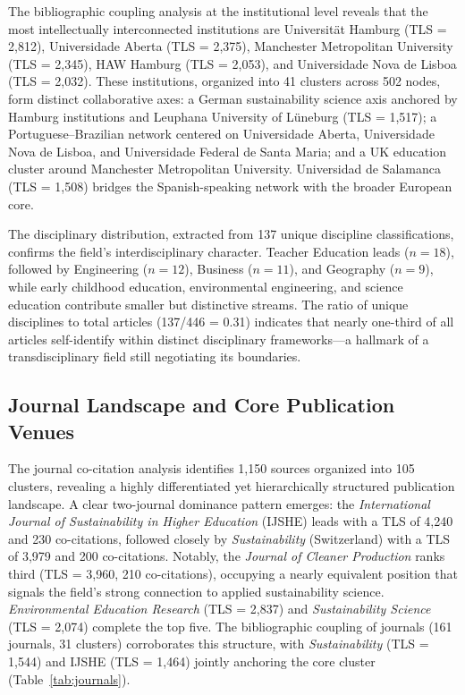 \documentclass[pdflatex,sn-basic]{sn-jnl}%
\begin{document}
The bibliographic coupling analysis at the institutional level reveals that the most intellectually interconnected institutions are Universit\"{a}t Hamburg (TLS = 2,812), Universidade Aberta (TLS = 2,375), Manchester Metropolitan University (TLS = 2,345), HAW Hamburg (TLS = 2,053), and Universidade Nova de Lisboa (TLS = 2,032). These institutions, organized into 41 clusters across 502 nodes, form distinct collaborative axes: a German sustainability science axis anchored by Hamburg institutions and Leuphana University of L\"{u}neburg (TLS = 1,517); a Portuguese--Brazilian network centered on Universidade Aberta, Universidade Nova de Lisboa, and Universidade Federal de Santa Maria; and a UK education cluster around Manchester Metropolitan University. Universidad de Salamanca (TLS = 1,508) bridges the Spanish-speaking network with the broader European core.

The disciplinary distribution, extracted from 137 unique discipline classifications, confirms the field's interdisciplinary character. Teacher Education leads ($n = 18$), followed by Engineering ($n = 12$), Business ($n = 11$), and Geography ($n = 9$), while early childhood education, environmental engineering, and science education contribute smaller but distinctive streams. The ratio of unique disciplines to total articles (137/446 = 0.31) indicates that nearly one-third of all articles self-identify within distinct disciplinary frameworks---a hallmark of a transdisciplinary field still negotiating its boundaries.

\subsection{Journal Landscape and Core Publication Venues}

The journal co-citation analysis identifies 1,150 sources organized into 105 clusters, revealing a highly differentiated yet hierarchically structured publication landscape. A clear two-journal dominance pattern emerges: the \textit{International Journal of Sustainability in Higher Education} (IJSHE) leads with a TLS of 4,240 and 230 co-citations, followed closely by \textit{Sustainability} (Switzerland) with a TLS of 3,979 and 200 co-citations. Notably, the \textit{Journal of Cleaner Production} ranks third (TLS = 3,960, 210 co-citations), occupying a nearly equivalent position that signals the field's strong connection to applied sustainability science. \textit{Environmental Education Research} (TLS = 2,837) and \textit{Sustainability Science} (TLS = 2,074) complete the top five. The bibliographic coupling of journals (161 journals, 31 clusters) corroborates this structure, with \textit{Sustainability} (TLS = 1,544) and IJSHE (TLS = 1,464) jointly anchoring the core cluster (Table~\ref{tab:journals}).
\end{document}
